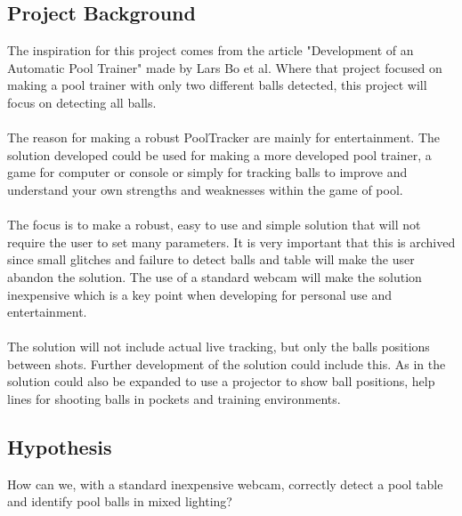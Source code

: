 \subsection{Project Background}
The inspiration for this project comes from the article "Development of an Automatic Pool Trainer"\cite{larsbopool} made by Lars Bo et al. Where that project focused on making a pool trainer with only two different balls detected, this project will focus on detecting all balls. 
\\\\
The reason for making a robust PoolTracker are mainly for entertainment. The solution developed could be used for making a more developed pool trainer, a game for computer or console or simply for tracking balls to improve and understand your own strengths and weaknesses within the game of pool.
\\\\
The focus is to make a robust, easy to use and simple solution that will not require the user to set many parameters. It is very important that this is archived since small glitches and failure to detect balls and table will make the user abandon the solution. The use of a standard webcam will make the solution inexpensive which is a key point when developing for personal use and entertainment.
\\\\
The solution will not include actual live tracking, but only the balls positions between shots. Further development of the solution could include this. As in \cite{larsbopool} the solution could also be expanded to use a projector to show ball positions, help lines for shooting balls in pockets and training environments. 

\subsection{Hypothesis}
How can we, with a standard inexpensive webcam, correctly detect a pool table and identify pool balls in mixed lighting?
